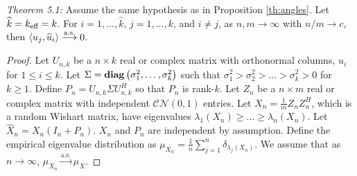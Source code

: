 \textit{Theorem 5.1:} Assume the same hypothesis as in Proposition \ref{th:angles}. Let $\widehat{k}=k_\text{eff}=k$. For $i=1,\dots,\widehat{k}$, $j=1,\dots,k$, and $i\neq j$, as $n,m\to\infty$ with $n/m\to c$, then $\langle u_j,\widehat{u}_i\rangle \overset{\textrm{a.s.}}{\longrightarrow} 0.$
\begin{proof}
Let $U_{n,k}$ be a $n\times k$ real or complex matrix with orthonormal columns, $u_i$ for $1\leq i\leq k$. Let $\Sigma = \mathop{\bf diag}\left(\sigma_1^2,\dots,\sigma_k^2\right)$ such that $\sigma_1^2>\sigma_2^2>\dots>\sigma_k^2>0$ for $k\geq 1$. Define $P_n=U_{n,k}\Sigma U_{n,k}^H$ so that $P_n$ is rank-$k$. Let $Z_n$ be a $n\times m$ real or complex matrix with independent $\mathcal{CN}\left(0,1\right)$ entries. Let $X_n=\frac{1}{m}Z_nZ_n^H$, which is a random Wishart matrix, have eigenvalues $\lambda_1(X_n)\geq\dots\geq\lambda_n(X_n)$. Let $\widehat{X}_n=X_n\left(I_n+P_n\right)$. $X_n$ and $P_n$ are independent by assumption. Define the empirical eigenvalue distribution as $\mu_{X_n}=\frac{1}{n}\sum_{j=1}^n\delta_{\lambda_j\left(X_n\right)}$. We assume that as $n\to\infty$, $\mu_{X_n}\overset{\text{a.s.}}{\longrightarrow}\mu_X$.



\end{proof}
